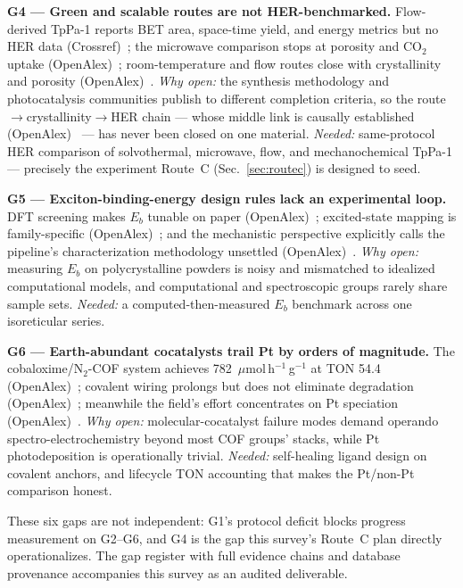 \textbf{G4 --- Green and scalable routes are not HER-benchmarked.} Flow-derived TpPa-1 reports
BET area, space-time yield, and energy metrics but no HER data
(Crossref)~\cite{xu2026structural}; the microwave comparison stops at porosity and CO$_2$
uptake (OpenAlex)~\cite{grenu2020microwave,wei2015the}; room-temperature and flow routes close
with crystallinity and porosity (OpenAlex)~\cite{peng2016room}. \emph{Why open:} the synthesis
methodology and photocatalysis communities publish to different completion criteria, so the
route$\rightarrow$crystallinity$\rightarrow$HER chain --- whose middle link is causally
established (OpenAlex)~\cite{ghosh2020identification} --- has never been closed on one
material. \emph{Needed:} same-protocol HER comparison of solvothermal, microwave, flow, and
mechanochemical TpPa-1 --- precisely the experiment Route~C (Sec.~\ref{sec:routec}) is designed
to seed.

\textbf{G5 --- Exciton-binding-energy design rules lack an experimental loop.} DFT screening
makes $E_b$ tunable on paper (OpenAlex)~\cite{qian2023computation}; excited-state mapping is
family-specific (OpenAlex)~\cite{chen2023tuning}; and the mechanistic perspective explicitly
calls the pipeline's characterization methodology unsettled (OpenAlex)~\cite{blatte2024photons}.
\emph{Why open:} measuring $E_b$ on polycrystalline powders is noisy and mismatched to idealized
computational models, and computational and spectroscopic groups rarely share sample sets.
\emph{Needed:} a computed-then-measured $E_b$ benchmark across one isoreticular series.

\textbf{G6 --- Earth-abundant cocatalysts trail Pt by orders of magnitude.} The
cobaloxime/N$_2$-COF system achieves 782~$\mu$mol\,h$^{-1}$\,g$^{-1}$ at TON 54.4
(OpenAlex)~\cite{banerjee2017single}; covalent wiring prolongs but does not eliminate
degradation (OpenAlex)~\cite{gottschling2020rational}; meanwhile the field's effort
concentrates on Pt speciation (OpenAlex)~\cite{dong2021platinum,li2022in}. \emph{Why open:}
molecular-cocatalyst failure modes demand operando spectro-electrochemistry beyond most COF
groups' stacks, while Pt photodeposition is operationally trivial. \emph{Needed:} self-healing
ligand design on covalent anchors, and lifecycle TON accounting that makes the Pt/non-Pt
comparison honest.

These six gaps are not independent: G1's protocol deficit blocks progress measurement on G2--G6,
and G4 is the gap this survey's Route~C plan directly operationalizes. The gap register with
full evidence chains and database provenance accompanies this survey as an audited deliverable.
